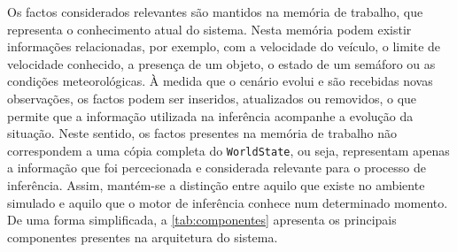Os factos considerados relevantes são mantidos na memória de trabalho, que
representa o conhecimento atual do sistema. Nesta memória podem existir
informações relacionadas, por exemplo, com a velocidade do veículo, o limite
de velocidade conhecido, a presença de um objeto, o estado de um semáforo ou
as condições meteorológicas. À medida que o cenário evolui e são recebidas
novas observações, os factos podem ser inseridos, atualizados ou removidos, o
que permite que a informação utilizada na inferência acompanhe a evolução da
situação. Neste sentido, os factos presentes na memória de trabalho não
correspondem a uma cópia completa do \texttt{WorldState}, ou seja,
representam apenas a informação que foi percecionada e considerada relevante
para o processo de inferência. Assim, mantém-se a distinção entre aquilo que
existe no ambiente simulado e aquilo que o motor de inferência conhece num
determinado momento. De uma forma simplificada, a \cref{tab:componentes}
apresenta os principais componentes presentes na arquitetura do sistema.

